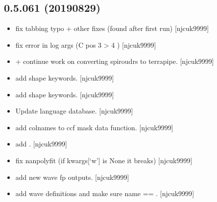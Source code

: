 \documentclass[a4paper,10pt,english]{report}
\begin{document}
\subsection{0.5.061 (2019\sphinxhyphen{}08\sphinxhyphen{}29)}
\label{\detokenize{misc/changelog:id100}}\begin{itemize}
\item {} 
 \sphinxhyphen{} fix tabbing typo + other fixes (found after
first run) {[}njcuk9999{]}

\item {} 
 \sphinxhyphen{} fix error in log args (C  pos 3 \textendash{}\textgreater{} 4 )
{[}njcuk9999{]}

\item {} 
 +  \sphinxhyphen{} continue work on
converting spiroudrs to terrapipe. {[}njcuk9999{]}

\item {} 
 \sphinxhyphen{} add shape keywords. {[}njcuk9999{]}

\item {} 
 \sphinxhyphen{} add shape keywords. {[}njcuk9999{]}

\item {} 
Update language database. {[}njcuk9999{]}

\item {} 
 \sphinxhyphen{} add colnames to ccf mask data function. {[}njcuk9999{]}

\item {} 
 \sphinxhyphen{} add . {[}njcuk9999{]}

\item {} 
 \sphinxhyphen{} fix nanpolyfit (if kwargs{[}‘w’{]} is None it
breaks) {[}njcuk9999{]}

\item {} 
 \sphinxhyphen{} add new wave fp
outputs. {[}njcuk9999{]}

\item {} 
 \sphinxhyphen{} add wave definitions and
make sure name == . {[}njcuk9999{]}


\end{itemize}
\end{document}
